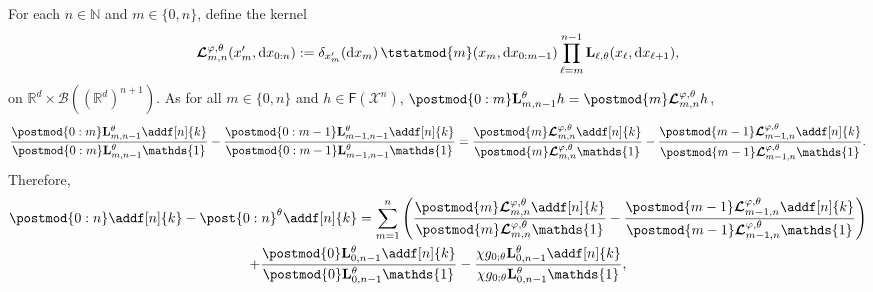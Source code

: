 \documentclass{article}
\newcommand{\Xfd}{\mathcal{X}}
\newcommand{\precpar}{\varphi}
\newcommand{\intvect}[2]{\{ #1, #2 \}}
\newcommand{\nset}{\mathbb{N}}
\newcommand{\1}{\mathbbm{1}}
\newcommand{\retrokmod}{\boldsymbol{\mathcal{L}}^{\precpar,\theta}}
\newcommand{\uk}[1]{\mathbf{L}_{#1}}
\newcommand{\md}[1]{g_{#1}}
\newcommand{\parvec}{\theta}
\newcommand{\bmf}[1]{\set{F}(#1)}
\newcommand{\set}[1]{\mathsf{#1}}
\def\1{\mathds{1}}
\newcommand{\rmd}{\ensuremath{\mathrm{d}}}
\newcommand{\eqdef}{\ensuremath{:=}}
\begin{document}
    For each $n \in \nset$ and $m \in \intvect{0}{n}$, define the kernel  
\begin{equation} \label{eq:def:retrokmod}
    \retrokmod_{m, n}(x_m', \rmd x_{0:n}) \eqdef \delta_{x_m'}(\rmd x_m) \, \tstatmod{m}(x_m, \rmd x_{0:m - 1}) \prod_{\ell = m}^{n - 1} \uk{\ell,\theta}(x_\ell, \rmd x_{\ell + 1}), 
\end{equation}
on  $\mathbb{R}^d \times \mathcal{B}((\mathbb{R}^d)^{n+1})$. 
As for all $m \in \intvect{0}{n}$ and $h \in \bmf{\Xfd^n}$, 
 $\postmod{0:m} \uk{m, n - 1}^\theta h = \postmod{m} \retrokmod_{m, n} h$,
$$
\frac{\postmod{0:m} \uk{m, n - 1}^\theta \addf[n]{k}}{\postmod{0:m} \uk{m, n - 1}^\theta \1_{}} - \frac{\postmod{0:m - 1} \uk{m - 1, n - 1}^\theta \addf[n]{k}}{\postmod{0:m - 1} \uk{m - 1, n - 1}^\theta \1_{}} 
= \frac{\postmod{m} \retrokmod_{m, n} \addf[n]{k}}{\postmod{m} \retrokmod_{m, n} \1_{}} - \frac{\postmod{m - 1} \retrokmod_{m - 1, n} \addf[n]{k}}{\postmod{m - 1} \retrokmod_{m - 1, n} \1_{}}. 
$$
Therefore,
\begin{multline}
\label{eq:error:decomp}
\postmod{0:n} \addf[n]{k} - \post{0:n}^\theta \addf[n]{k} = 
\sum_{m = 1}^n \left( \frac{\postmod{m} \retrokmod_{m, n} \addf[n]{k}}{\postmod{m} \retrokmod_{m, n} \1_{}} - \frac{\postmod{m - 1} \retrokmod_{m - 1, n} \addf[n]{k}}{\postmod{m - 1} \retrokmod_{m - 1, n} \1_{}} \right) \\ + \frac{\postmod{0} \uk{0, n - 1}^\theta \addf[n]{k}}{\postmod{0} \uk{0, n - 1}^\theta \1_{}} - \frac{\chi \md{0;\parvec}\uk{0, n - 1}^\theta \addf[n]{k}}{\chi\md{0;\parvec}\uk{0, n - 1}^\theta \1_{}},
\end{multline}
\end{document}
